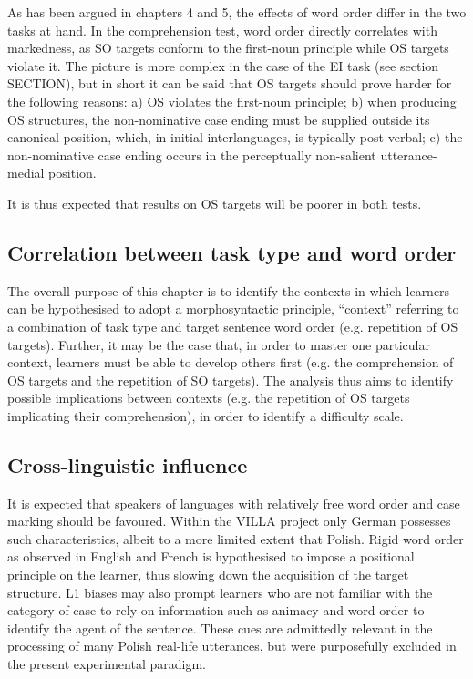 As has been argued in chapters 4 and 5, the effects of word order differ in the two tasks at hand. In the comprehension test, word order directly correlates with markedness, as SO targets conform to the first-noun principle while OS targets violate it. The picture is more complex in the case of the EI task (see section SECTION), but in short it can be said that OS targets should prove harder for the following reasons: a) OS violates the first-noun principle; b) when producing OS structures, the non-nominative case ending must be supplied outside its canonical position, which, in initial interlanguages, is typically post-verbal; c) the non-nominative case ending occurs in the perceptually non-salient utterance-medial position. 

It is thus expected that results on OS targets will be poorer in both tests.

\subsection{Correlation between task type and word order}\label{sec:06:1.3}

The overall purpose of this chapter is to identify the contexts in which learners can be hypothesised to adopt a morphosyntactic principle, “context” referring to a combination of task type and target sentence word order (e.g. repetition of OS targets). Further, it may be the case that, in order to master one particular context, learners must be able to develop others first (e.g. the comprehension of OS targets and the repetition of SO targets). The analysis thus aims to identify possible implications between contexts (e.g. the repetition of OS targets implicating their comprehension), in order to identify a difficulty scale. 

\subsection{Cross-linguistic influence}\label{sec:06:1.4}

It is expected that speakers of languages with relatively free word order and case marking should be favoured. Within the VILLA project only German possesses such characteristics, albeit to a more limited extent that Polish. Rigid word order as observed in English and French is hypothesised to impose a positional principle on the learner, thus slowing down the acquisition of the target structure. L1 biases may also prompt learners who are not familiar with the category of case to rely on information such as animacy and word order to identify the agent of the sentence. These cues are admittedly relevant in the processing of many Polish real-life utterances, but were purposefully excluded in the present experimental paradigm.

